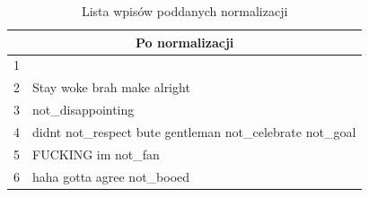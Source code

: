 \begin{table}[ht!]  
\begin{center}  
\begin{tabular}{|r|p{140mm}|}
\hline
\multicolumn{2}{|c|}{Po normalizacji}
\\ \hline
1 & 
\\ \hline
2 & Stay woke brah make alright
\\ \hline
3 & not\_disappointing
\\ \hline
4 & didnt not\_respect bute gentleman not\_celebrate not\_goal
\\ \hline
5 & FUCKING im not\_fan
\\ \hline
6 & haha gotta agree not\_booed
\\
\hline
\end{tabular} 
\end{center} 
\caption{Lista wpisów poddanych normalizacji}
\label{tab:wpisy-po-normalizacja}
\end{table}

